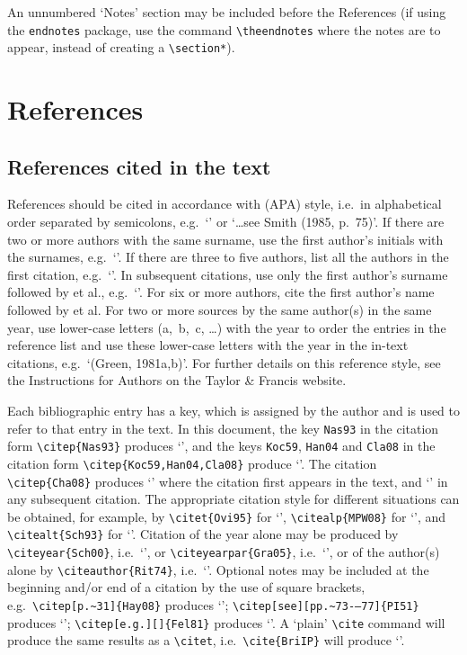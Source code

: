 \documentclass[]{interact}
\theoremstyle{plain}%
\theoremstyle{definition}
\theoremstyle{remark}
\begin{document}
An unnumbered `Notes' section may be included before the References (if using the \verb"endnotes" package, use the command \verb"\theendnotes" where the notes are to appear, instead of creating a \verb"\section*").


\section{References}

\subsection{References cited in the text}

References should be cited in accordance with \citeauthor{APA10} (APA) style, i.e.\ in alphabetical order separated by semicolons, e.g.\ `\citep{Ban77,Pia88,VL07}' or `\ldots see Smith (1985, p.~75)'. If there are two or more authors with the same surname, use the first author's initials with the surnames, e.g.\ `\citep{Lig08,Lig06}'. If there are three to five authors, list all the authors in the first citation, e.g.\ `\citep{GSSM91}'. In subsequent citations, use only the first author's surname followed by et al., e.g.\ `\citep{GSSM91}'. For six or more authors, cite the first author's name followed by et al. For two or more sources by the same author(s) in the same year, use lower-case letters (a,~b,~c, \ldots) with the year to order the entries in the reference list and use these lower-case letters with the year in the in-text citations, e.g.\ `(Green, 1981a,b)'. For further details on this reference style, see the Instructions for Authors on the Taylor \& Francis website.

Each bibliographic entry has a key, which is assigned by the author and is used to refer to that entry in the text. In this document, the key \verb"Nas93" in the citation form \verb"\citep{Nas93}" produces `\citep{Nas93}', and the keys \verb"Koc59", \verb"Han04" and \verb"Cla08" in the citation form \verb"\citep{Koc59,Han04,Cla08}" produce `\citep{Koc59,Han04,Cla08}'. The citation \verb"\citep{Cha08}" produces `\citep{Cha08}' where the citation first appears in the text, and `\citep{Cha08}' in any subsequent citation. The appropriate citation style for different situations can be obtained, for example, by \verb"\citet{Ovi95}" for `\citet{Ovi95}', \verb"\citealp{MPW08}" for `\citealp{MPW08}', and \verb"\citealt{Sch93}" for `\citealt{Sch93}'. Citation of the year alone may be produced by \verb"\citeyear{Sch00}", i.e.\ `\citeyear{Sch00}', or \verb"\citeyearpar{Gra05}", i.e.\ `\citeyearpar{Gra05}', or of the author(s) alone by \verb"\citeauthor{Rit74}", i.e.\ `\citeauthor{Rit74}'. Optional notes may be included at the beginning and/or end of a citation by the use of square brackets, e.g.\ \verb"\citep[p.~31]{Hay08}" produces `\citep[p.~31]{Hay08}'; \verb"\citep[see][pp.~73-–77]{PI51}" produces `\citep[see][pp.~73--77]{PI51}'; \verb"\citep[e.g.][]{Fel81}" produces `\citep[e.g.][]{Fel81}'. A `plain' \verb"\cite" command will produce the same results as a \verb"\citet", i.e.\ \verb"\cite{BriIP}" will produce `\cite{BriIP}'.
\end{document}
